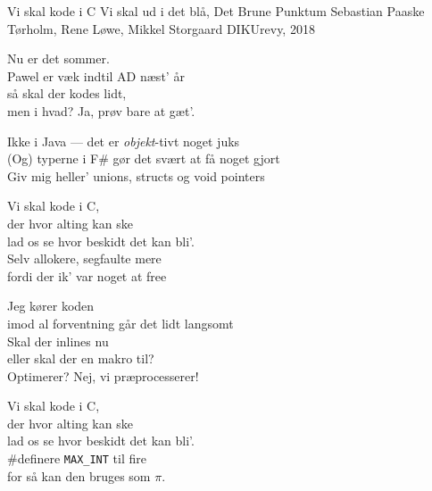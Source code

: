 \begin{song}{Vi skal kode i C}
  {} %
  {Vi skal ud i det blå, Det Brune Punktum} %
  {Sebastian Paaske Tørholm, Rene Løwe, Mikkel Storgaard} %
  {DIKUrevy, 2018} %
  {\NotCCLIed} %

\begin{SBVerse}
  Nu er det sommer. \\
  Pawel er væk indtil AD næst' år \\
  så skal der kodes lidt, \\
  men i hvad? Ja, prøv bare at gæt'. \\
\end{SBVerse}
  
\begin{SBVerse}
  Ikke i Java --- det er \emph{objekt}-tivt noget juks \\
  (Og) typerne i F\# gør det svært at få noget gjort \\
  Giv mig heller' unions, structs og void pointers \\
\end{SBVerse}

\begin{SBChorus}
  Vi skal kode i C, \\
  der hvor alting kan ske \\
  lad os se hvor beskidt det kan bli'. \\
  Selv allokere, segfaulte mere \\
  fordi der ik' var noget at free \\
\end{SBChorus}

\begin{SBVerse}
  Jeg kører koden \\
  imod al forventning går det lidt langsomt \\
  Skal der inlines nu \\
  eller skal der en makro til? \\
  Optimerer? Nej, vi præprocesserer! \\
\end{SBVerse}

\begin{SBChorus}
  Vi skal kode i C, \\
  der hvor alting kan ske \\
  lad os se hvor beskidt det kan bli'. \\
  \#definere \texttt{MAX\_INT} til fire \\
  for så kan den bruges som $\pi$. \\
\end{SBChorus}
  

\end{song}
